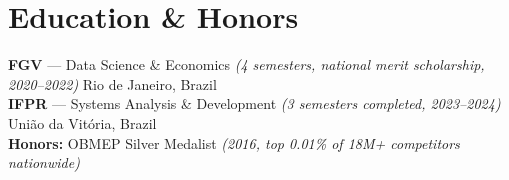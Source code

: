 \documentclass[10pt,a4paper]{article}
\begin{document}
\section{Education \& Honors}
\textbf{FGV} --- Data Science \& Economics \textit{(4 semesters, national merit scholarship, \mbox{2020--2022})} \hfill Rio de Janeiro, Brazil \\
\textbf{IFPR} --- Systems Analysis \& Development \textit{(3 semesters completed, \mbox{2023--2024})} \hfill União da Vitória, Brazil \\
\textbf{Honors:} OBMEP Silver Medalist \textit{(2016, top 0.01\% of 18M+ competitors nationwide)}
\end{document}
